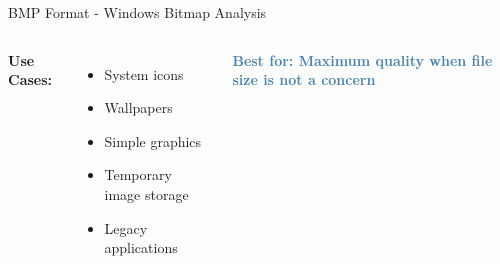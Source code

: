 \documentclass[aspectratio=1610,8pt]{beamer}
\begin{document}
\begin{frame}{BMP Format - Windows Bitmap Analysis}
\begin{columns}[T]
\textbf{Use Cases:}
\begin{itemize}
    \item System icons
    \item Wallpapers
    \item Simple graphics
    \item Temporary image storage
    \item Legacy applications
\end{itemize}

\vspace{0.5cm}
\begin{center}
\textcolor{steelblue}{\textbf{Best for: Maximum quality when file size is not a concern}}
\end{center}

\end{columns}
\end{frame}
\end{document}
